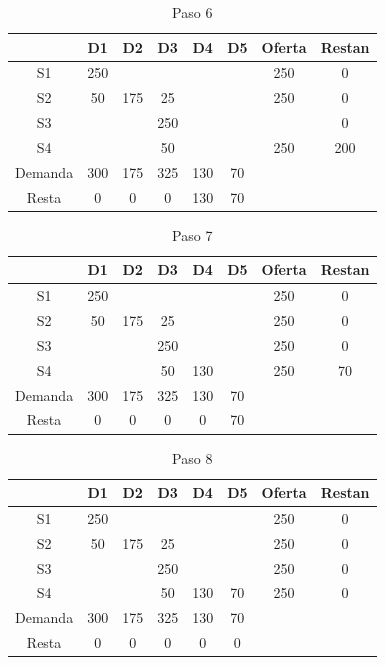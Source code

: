 \documentclass[12pt]{article}  %
\begin{document}
\begin{table}[H]
        \centering
        \caption{Paso 6}
        \label{tab:paso6Prob3}
        \begin{tabular}{c|ccccc|cc}
        & D1 & D2 & D3 & D4 & D5 & Oferta & Restan \\
        \hline
        S1 & 250 &  &  &  &  & 250 & 0 \\
        S2 &  50 & 175 & 25 &  &  & 250 & 0 \\
        S3 &  &  & 250 &  &  &  & 0 \\
        S4 &  &  & \cellcolor{yellow} 50 &  &  & 250 & 200 \\
        \hline
        Demanda & 300 & 175 & 325 & 130 & 70 & & \\
        Resta & 0 & 0 & 0 & 130 & 70 & & \\
        \end{tabular}
\end{table}

\begin{table}[H]
        \centering
        \caption{Paso 7}
        \label{tab:paso7Prob3}
        \begin{tabular}{c|ccccc|cc}
        & D1 & D2 & D3 & D4 & D5 & Oferta & Restan \\
        \hline
        S1 & 250 &  &  &  &  & 250 & 0 \\
        S2 &  50 & 175 & 25 &  &  & 250 & 0 \\
        S3 &  &  & 250 &  &  & 250 & 0 \\
        S4 &  &  &  50 & \cellcolor{yellow} 130 &  & 250 & 70 \\
        \hline
        Demanda & 300 & 175 & 325 & 130 & 70 & & \\
        Resta & 0 & 0 & 0 & 0 & 70 & & \\
        \end{tabular}
    \end{table}

\begin{table}[H]
        \centering
        \caption{Paso 8}
        \label{tab:paso8Prob3}
        \begin{tabular}{c|ccccc|cc}
        & D1 & D2 & D3 & D4 & D5 & Oferta & Restan \\
        \hline
        S1 & 250 &  &  &  &  & 250 & 0 \\
        S2 &  50 & 175 & 25 &  &  & 250 & 0 \\
        S3 &  &  & 250 &  &  & 250 & 0 \\
        S4 &  &  &  50 & 130 & \cellcolor{yellow}70 & 250 & 0 \\
        \hline
        Demanda & 300 & 175 & 325 & 130 & 70 & & \\
        Resta & 0 & 0 & 0 & 0 & 0 & & \\
        \end{tabular}
\end{table}
\end{document}
